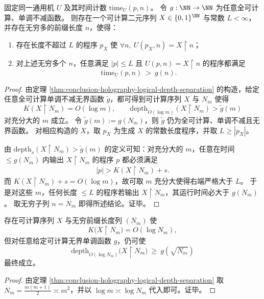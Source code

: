 \begin{corollary}\label{cor:conclusion-holography-arbitrarily-slow-readout}
固定同一通用机 \(U\) 及其时间计数 \(\mathrm{time}_U(p,n)\)。
令 \(g:\NN\to\NN\) 为任意全可计算、单调不减函数。
则存在一个可计算二元序列 \(X\in\{0,1\}^{\NN}\) 与常数 \(L<\infty\)，并存在无穷多的前缀长度 \(n\)，使得：
\begin{enumerate}
  \item 存在长度不超过 \(L\) 的程序 \(p_X\) 使 \(\forall n,\ U(p_X,n)=X\upharpoonright n\)；
  \item 对上述无穷多个 \(n\)，任意满足 \(|p|\le L\) 且 \(U(p,n)=X\upharpoonright n\) 的程序都满足
        \[
        \mathrm{time}_U(p,n)\ >\ g(n).
        \]
\end{enumerate}
\end{corollary}
\begin{proof}
由定理 \ref{thm:conclusion-holography-logical-depth-separation} 的构造，给定任意全可计算单调不减无界函数 \(\widetilde g\)，都可得到可计算序列 \(X\) 与 \(N_m\) 使得
\[
K(X\upharpoonright N_m)=O(\log m),
\qquad
\mathrm{depth}_{O(\log m)}(X\upharpoonright N_m)>\widetilde g(m)
\]
对充分大的 \(m\) 成立。
令 \(\widetilde g(m):=g(N_m)\)，则 \(\widetilde g\) 仍为全可计算、单调不减且无界函数。
对相应构造的 \(X\)，取 \(p_X\) 为生成 \(X\) 的常数长度程序，并取 \(L\ge |p_X|\)。
\par
由 \(\mathrm{depth}_{s}(X\upharpoonright N_m)>\widetilde g(m)\) 的定义可知：对充分大的 \(m\)，任意在时间 \(\le g(N_m)\) 内输出 \(X\upharpoonright N_m\) 的程序 \(p\) 都必须满足
\[
|p|>K(X\upharpoonright N_m)+s.
\]
而 \(K(X\upharpoonright N_m)+s=O(\log m)\)，故可取 \(m\) 充分大使得右端严格大于 \(L\)。
于是对这些 \(m\)，任何长度 \(\le L\) 的程序若输出 \(X\upharpoonright N_m\)，其运行时间必大于 \(g(N_m)\)。
取无穷子列 \(n=N_m\) 即得所述结论。证毕。
\end{proof}

\begin{corollary}\label{cor:conclusion-holography-logical-depth-separation-Nm}
存在可计算序列 \(X\) 与无穷前缀长度列 \((N_m)\) 使
\[
K\!\bigl(X\upharpoonright N_m\bigr)=O(\log N_m),
\]
但对任意给定可计算无界单调函数 \(g\)，仍可使
\[
\mathrm{depth}_{O(\log N_m)}\!\bigl(X\upharpoonright N_m\bigr)\ \ge\ g(\sqrt{N_m})
\]
最终成立。
\end{corollary}
\begin{proof}
由定理 \ref{thm:conclusion-holography-logical-depth-separation} 取 \(N_m=\frac{m(m+1)}2\asymp m^2\)，并以 \(\log m\asymp \log N_m\) 代入即可。证毕。
\end{proof}

